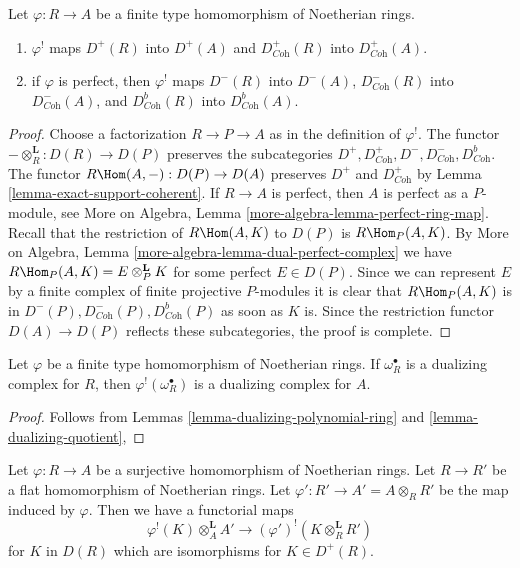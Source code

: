 \begin{lemma}
\label{lemma-shriek-boundedness}
Let $\varphi : R \to A$ be a finite type homomorphism of Noetherian rings.
\begin{enumerate}
\item $\varphi^!$ maps $D^+(R)$ into $D^+(A)$ and
$D^+_{\textit{Coh}}(R)$ into $D^+_{\textit{Coh}}(A)$.
\item if $\varphi$ is perfect, then $\varphi^!$ maps
$D^-(R)$ into $D^-(A)$,
$D^-_{\textit{Coh}}(R)$ into $D^-_{\textit{Coh}}(A)$, and
$D^b_{\textit{Coh}}(R)$ into $D^b_{\textit{Coh}}(A)$.
\end{enumerate}
\end{lemma}

\begin{proof}
Choose a factorization $R \to P \to A$ as in the definition of $\varphi^!$.
The functor $- \otimes_R^\mathbf{L} : D(R) \to D(P)$ preserves
the subcategories
$D^+, D^+_{\textit{Coh}}, D^-, D^-_{\textit{Coh}}, D^b_{\textit{Coh}}$.
The functor $R\Hom(A, -) : D(P) \to D(A)$
preserves $D^+$ and $D^+_{\textit{Coh}}$ by
Lemma \ref{lemma-exact-support-coherent}.
If $R \to A$ is perfect, then $A$ is perfect as a $P$-module, see
More on Algebra, Lemma \ref{more-algebra-lemma-perfect-ring-map}.
Recall that the restriction of $R\Hom(A, K)$ to $D(P)$ is
$R\Hom_P(A, K)$. By More on Algebra, Lemma
\ref{more-algebra-lemma-dual-perfect-complex}
we have $R\Hom_P(A, K) = E \otimes_P^\mathbf{L} K$ for
some perfect $E \in D(P)$. Since we can represent $E$ by
a finite complex of finite projective $P$-modules
it is clear that $R\Hom_P(A, K)$ is in
$D^-(P), D^-_{\textit{Coh}}(P), D^b_{\textit{Coh}}(P)$
as soon as $K$ is. Since the restriction functor
$D(A) \to D(P)$ reflects these subcategories, the
proof is complete.
\end{proof}

\begin{lemma}
\label{lemma-shriek-dualizing-algebraic}
Let $\varphi$ be a finite type homomorphism of Noetherian rings.
If $\omega_R^\bullet$ is a dualizing complex for $R$, then
$\varphi^!(\omega_R^\bullet)$ is a dualizing complex for $A$.
\end{lemma}

\begin{proof}
Follows from Lemmas \ref{lemma-dualizing-polynomial-ring} and
\ref{lemma-dualizing-quotient},
\end{proof}

\begin{lemma}
\label{lemma-flat-bc-surjection}
Let $\varphi : R \to A$ be a surjective homomorphism of Noetherian rings.
Let $R \to R'$ be a flat homomorphism of Noetherian rings.
Let $\varphi' : R' \to A' = A \otimes_R R'$ be the map induced by $\varphi$.
Then we have a functorial maps
$$
\varphi^!(K) \otimes_A^\mathbf{L} A'
\longrightarrow
(\varphi')^!(K \otimes_R^\mathbf{L} R')
$$
for $K$ in $D(R)$ which are isomorphisms for $K \in D^+(R)$.
\end{lemma}

